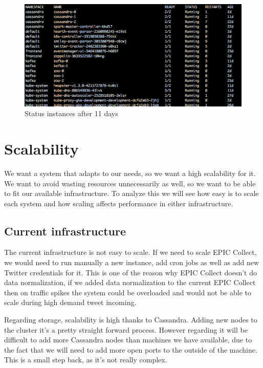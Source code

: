 \begin{figure}
\centering
\includegraphics[width=\textwidth]{Figures/pods}
\decoRule
\caption[Status instances]{Status instances after 11 days}
\label{fig:pods}
\end{figure}

\section{Scalability}

We want a system that adapts to our needs, so we want a high scalability for it. We want to avoid wasting resources unnecessarily as well, so we want to be able to fit our available infrastructure. To analyze this we will see how easy is to scale each system and how scaling affects performance in either infrastructure.

\subsection{Current infrastructure}

The current infrastructure is not easy to scale. If we need to scale EPIC Collect, we would need to run manually a new instance, add cron jobs as well as add new Twitter credentials for it. This is one of the reason why EPIC Collect doesn’t do data normalization, if we added data normalization to the current EPIC Collect then on traffic spikes the system could be overloaded and would not be able to scale during high demand tweet incoming. 

Regarding storage, scalability is high thanks to Cassandra. Adding new nodes to the cluster it’s a pretty straight forward process. However regarding it will be difficult to add more Cassandra nodes than machines we have available, due to the fact that we will need to add more open ports to the outside of the machine. This is a small step back, as it’s not really complex. 

